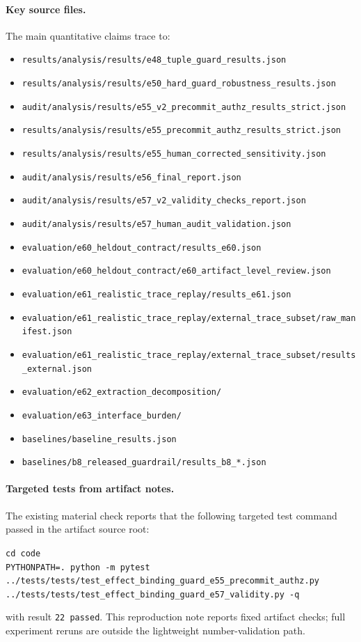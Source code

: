 \paragraph{Key source files.}
The main quantitative claims trace to:
\begin{itemize}[leftmargin=*]
\item \texttt{results/analysis/results/e48\_tuple\_guard\_results.json}
\item \texttt{results/analysis/results/e50\_hard\_guard\_robustness\_results.json}
\item \texttt{audit/analysis/results/e55\_v2\_precommit\_authz\_results\_strict.json}
\item \texttt{results/analysis/results/e55\_precommit\_authz\_results\_strict.json}
\item \texttt{results/analysis/results/e55\_human\_corrected\_sensitivity.json}
\item \texttt{audit/analysis/results/e56\_final\_report.json}
\item \texttt{audit/analysis/results/e57\_v2\_validity\_checks\_report.json}
\item \texttt{audit/analysis/results/e57\_human\_audit\_validation.json}
\item \texttt{evaluation/e60\_heldout\_contract/results\_e60.json}
\item \texttt{evaluation/e60\_heldout\_contract/e60\_artifact\_level\_review.json}
\item \texttt{evaluation/e61\_realistic\_trace\_replay/results\_e61.json}
\item \texttt{evaluation/e61\_realistic\_trace\_replay/external\_trace\_subset/raw\_manifest.json}
\item \texttt{evaluation/e61\_realistic\_trace\_replay/external\_trace\_subset/results\_external.json}
\item \texttt{evaluation/e62\_extraction\_decomposition/}
\item \texttt{evaluation/e63\_interface\_burden/}
\item \texttt{baselines/baseline\_results.json}
\item \texttt{baselines/b8\_released\_guardrail/results\_b8\_*.json}
\end{itemize}

\paragraph{Targeted tests from artifact notes.}
The existing material check reports that the following targeted test command passed in the artifact source root:
\begin{flushleft}
\small\texttt{cd code}\\
\small\texttt{PYTHONPATH=. python -m pytest}\\
\small\texttt{../tests/tests/test\_effect\_binding\_guard\_e55\_precommit\_authz.py}\\
\small\texttt{../tests/tests/test\_effect\_binding\_guard\_e57\_validity.py -q}
\end{flushleft}
with result \texttt{22 passed}. This reproduction note reports fixed artifact checks; full experiment reruns are outside the lightweight number-validation path.
